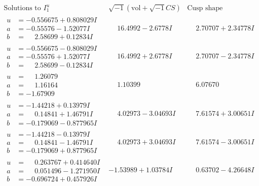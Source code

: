 \documentclass[1p]{elsarticle_modified}
\theoremstyle{definition}
\newcommand{\I}{\sqrt{-1}}
\begin{document}
$$\begin{array}{c|c|c}  
\text{Solutions to }I^u_{1}& \I (\text{vol} + \sqrt{-1}CS) & \text{Cusp shape}\\
 \hline 
\begin{aligned}
u &= -0.556675 + 0.808029 I \\
a &= -0.55576 - 1.52077 I \\
b &= \phantom{-}2.58699 + 0.12834 I\end{aligned}
 & \phantom{-}16.4992 - 2.6778 I & \phantom{-}2.70707 + 2.34778 I \\ \hline\begin{aligned}
u &= -0.556675 - 0.808029 I \\
a &= -0.55576 + 1.52077 I \\
b &= \phantom{-}2.58699 - 0.12834 I\end{aligned}
 & \phantom{-}16.4992 + 2.6778 I & \phantom{-}2.70707 - 2.34778 I \\ \hline\begin{aligned}
u &= \phantom{-}1.26079\phantom{ +0.000000I} \\
a &= \phantom{-}1.16164\phantom{ +0.000000I} \\
b &= -1.67909\phantom{ +0.000000I}\end{aligned}
 & \phantom{-}1.10399\phantom{ +0.000000I} & \phantom{-}6.07670\phantom{ +0.000000I} \\ \hline\begin{aligned}
u &= -1.44218 + 0.13979 I \\
a &= \phantom{-}0.14841 + 1.46791 I \\
b &= -0.179069 - 0.877965 I\end{aligned}
 & \phantom{-}4.02973 - 3.04693 I & \phantom{-}7.61574 + 3.00651 I \\ \hline\begin{aligned}
u &= -1.44218 - 0.13979 I \\
a &= \phantom{-}0.14841 - 1.46791 I \\
b &= -0.179069 + 0.877965 I\end{aligned}
 & \phantom{-}4.02973 + 3.04693 I & \phantom{-}7.61574 - 3.00651 I \\ \hline\begin{aligned}
u &= \phantom{-}0.263767 + 0.414640 I \\
a &= \phantom{-}0.051496 - 1.271950 I \\
b &= -0.696724 + 0.457926 I\end{aligned}
 & -1.53989 + 1.03784 I & \phantom{-}0.63702 - 4.26648 I \\ \hline\begin{aligned}

\end{aligned}
\end{array}$$
\end{document}
